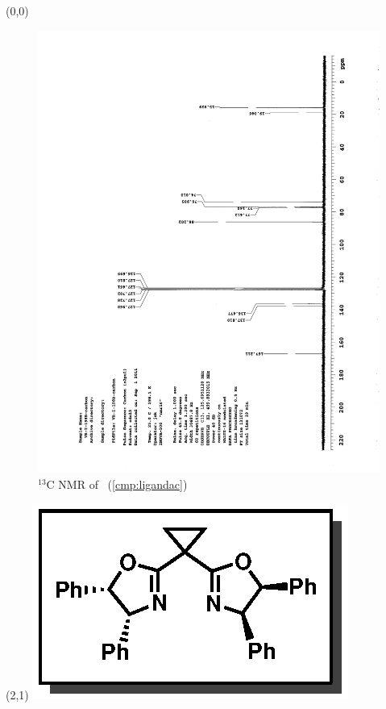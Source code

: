 \clearpage
\begin{textblock}{20}(0,0)
\begin{figure}[htb]
\caption{$^{13}$C NMR of  \CMPligandac\ (\ref{cmp:ligandac})}
\includegraphics[scale=0.75, trim = 0mm 0mm 0mm 5mm,
clip]{chp_asymmetric/images/nmr/ligandacC}
\vspace{-100pt}
\end{figure}
\end{textblock}
\begin{textblock}{1}(2,1)
\includegraphics[scale=0.8, angle=90]{chp_asymmetric/images/ligandac}
\end{textblock}
\clearpage

